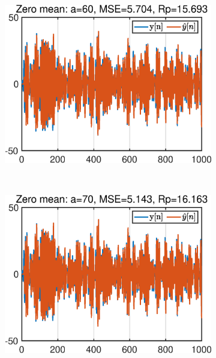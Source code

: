 \begin{figure}[htb]
\begin{subfigure}[b]{0.33\textwidth}
         \centering
         \includegraphics[width=\textwidth]{fig/4/43a3.eps}
     \end{subfigure}
     \\
     \hspace{-0.4cm}
     \begin{subfigure}[b]{0.33\textwidth}
         \centering
         \includegraphics[width=\textwidth]{fig/4/43a4.eps}
     \end{subfigure}
    \hspace{-0.2cm}
     \begin{subfigure}[b]{0.33\textwidth}
         \centering

\end{subfigure}
\end{figure}
